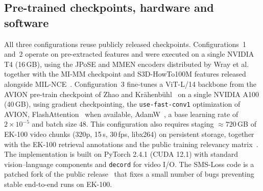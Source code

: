 \subsection{Pre-trained checkpoints, hardware and software}
\label{sec:materials:stack}

All three configurations reuse publicly released checkpoints. Configurations~1 and~2 operate on pre-extracted features and were executed on a single NVIDIA T4 (16\,GB), using the JPoSE and MMEN encoders distributed by Wray et al.~\cite{wray2019jpose} together with the MI-MM checkpoint and S3D-HowTo100M features released alongside MIL-NCE~\cite{miech2020milnce}. Configuration~3 fine-tunes a ViT-L/14 backbone from the AVION pre-train checkpoint of Zhao and Kr\"ahenb\"uhl~\cite{zhao2023avion} on a single NVIDIA A100 (40\,GB), using gradient checkpointing, the \texttt{use-fast-conv1} optimization of AVION, FlashAttention~\cite{dao2022flashattention} when available, AdamW~\cite{loshchilov2019adamw}, a base learning rate of $2\times 10^{-5}$ and batch size $48$. This configuration also requires staging $\approx 720$\,GB of EK-100 video chunks (320p, 15\,s, 30\,fps, libx264) on persistent storage, together with the EK-100 retrieval annotations and the public training relevancy matrix~\cite{wray2021semantic}. The implementation is built on PyTorch 2.4.1 (CUDA 12.1) with standard vision--language components and \texttt{decord} for video I/O. The SMS-Loss code is a patched fork of the public release~\cite{wang2024smsloss_repo,wang2024symmetricmultisimilaritylossepickitchens100} that fixes a small number of bugs preventing stable end-to-end runs on EK-100.

